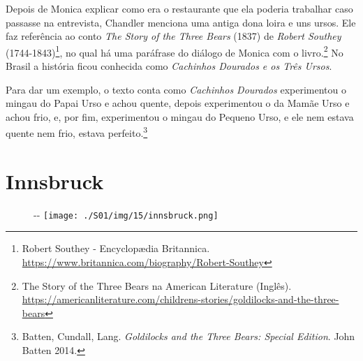 Depois de Monica explicar como era o restaurante que ela poderia
trabalhar caso passasse na entrevista, Chandler menciona uma antiga dona
loira e uns ursos. Ele faz referência ao conto \emph{The Story of the
Three Bears} (1837) de \emph{Robert Southey} (1744-1843)\footnote{\sloppy Robert Southey - Encyclopædia Britannica. \url{https://www.britannica.com/biography/Robert-Southey}},
no qual há uma paráfrase do diálogo de Monica com o livro.\footnote{\sloppy The Story of the Three Bears na American Literature (Inglês). \url{https://americanliterature.com/childrens-stories/goldilocks-and-the-three-bears}}
No Brasil a história ficou conhecida como \emph{Cachinhos Dourados e os
Três Ursos}.

Para dar um exemplo, o texto conta como \emph{Cachinhos Dourados}
experimentou o mingau do Papai Urso e achou quente, depois experimentou
o da Mamãe Urso e achou frio, e, por fim, experimentou o mingau do
Pequeno Urso, e ele nem estava quente nem frio, estava
perfeito.\footnote{Batten, Cundall, Lang. \emph{Goldilocks and the Three
  Bears: Special Edition}. John Batten 2014.}

\hypertarget{innsbruck}{%
\section{Innsbruck}\label{innsbruck}}

\begin{figure}[!ht]
  \begin{adjustwidth}{-\oddsidemargin-1in}{-\rightmargin}
    \centering
    \texttt{[image: ./S01/img/15/innsbruck.png]}
  \end{adjustwidth}
\end{figure}

